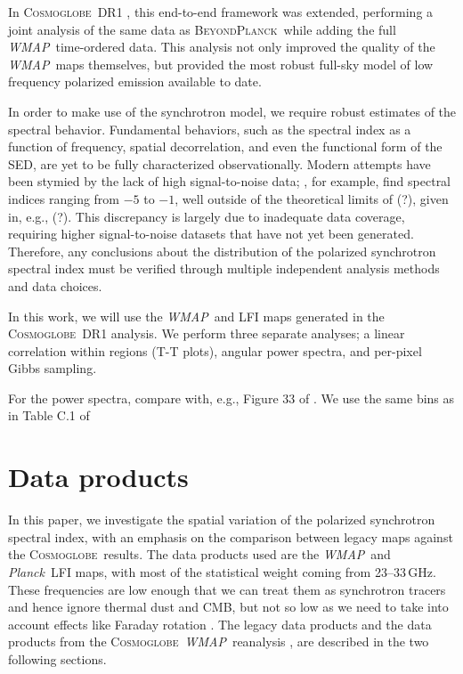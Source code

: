 \documentclass[twocolumn]{../../common/aa}
\def\WMAP{\emph{WMAP}}
\def\Planck{\emph{Planck}}
\newcommand{\bp}{\textsc{BeyondPlanck}}
\newcommand{\cosmoglobe}{\textsc{Cosmoglobe}}
\begin{document}
In \cosmoglobe\ DR1 \citep{watts2023_dr1}, this end-to-end framework was extended, performing a joint analysis of the same data as \bp\ while adding the full \WMAP\ time-ordered data. This analysis not only improved the quality of the \WMAP\ maps themselves, but provided the most robust full-sky model of low frequency polarized emission available to date.

In order to make use of the synchrotron model, we require robust estimates of the spectral behavior. Fundamental behaviors, such as the spectral index as a function of frequency, spatial decorrelation, and even the functional form of the SED, are yet to be fully characterized observationally. Modern attempts have been stymied by the lack of high signal-to-noise data; \citet{deBelsunce:2022}, for example, find spectral indices ranging from $-5$ to $-1$, well outside of the theoretical limits of (?), given in, e.g., (?). This discrepancy is largely due to inadequate data coverage, requiring higher signal-to-noise datasets that have not yet been generated. Therefore, any conclusions about the distribution of the polarized synchrotron spectral index must be verified through multiple independent analysis methods and data choices.


In this work, we will use the \WMAP\ and LFI maps generated in the \cosmoglobe\ DR1 analysis. We perform three separate analyses; a linear correlation within regions (T-T plots), angular power spectra, and per-pixel Gibbs sampling.

For the power spectra, compare with, e.g., Figure 33 of \citet{planck2016-l04}. We use the same bins as in Table C.1 of \citet{planck2016-l11A}




\section{Data products}
\label{sec:data}

In this paper, we investigate the spatial variation of the polarized synchrotron spectral index, with an emphasis on the comparison between  legacy maps against the \cosmoglobe\ results. The data products used are the \WMAP\ and \Planck\ LFI maps, with most of the statistical weight coming from 23--33\,GHz. These frequencies are low enough that we can treat them as synchrotron tracers and hence ignore thermal dust and CMB, but not so low as we need to take into account effects like Faraday rotation \citep{fuskeland:2019}. The legacy data products and the data products from the \cosmoglobe\ \WMAP\ reanalysis \citep{watts2023_dr1}, are described in the two following sections.
\end{document}
